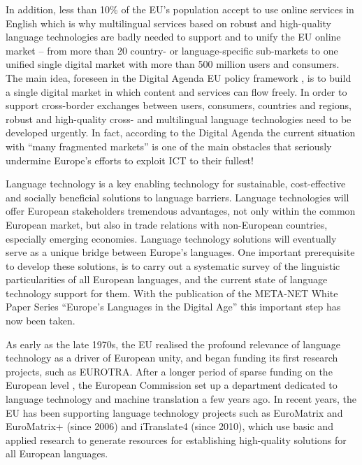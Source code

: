 \documentclass[10pt, plain]{../../metanetpaper}
\begin{document}
\begin{multicols}{2}
In addition, less than 10\% of the EU's population accept to use online services in English which is why multilingual services based on robust and high-quality language technologies are badly needed to support and to unify the EU online market -- from more than 20 country- or language-specific sub-markets to one unified single digital market with more than 500 million users and consumers. The main idea, foreseen in the Digital Agenda EU policy framework \cite{DA2010}, is to build a single digital market in which content and services can flow freely. In order to support cross-border exchanges between users, consumers, countries and regions, robust and high-quality cross- and multilingual language technologies need to be developed urgently. In fact, according to the Digital Agenda \cite{DA2010} the current situation with ``many fragmented markets'' is one of the main obstacles that seriously undermine Europe's efforts to exploit ICT to their fullest!

Language technology is a key enabling technology for sustainable, cost-effective and socially beneficial solutions to language barriers. Language technologies will offer European stakeholders tremendous advantages, not only within the common European market, but also in trade relations with non-European countries, especially emerging economies. Language technology solutions will eventually serve as a unique bridge between Europe's languages. One important prerequisite to develop these solutions, is to carry out a systematic survey of the linguistic particularities of all European languages, and the current state of language technology support for them. With the publication of the META-NET White Paper Series ``Europe's Languages in the Digital Age'' \cite{LWP2012} this important step has now been taken.

As early as the late 1970s, the EU realised the profound relevance of language technology as a driver of European unity, and began funding its first research projects, such as EUROTRA. After a longer period of sparse funding on the European level \cite{laz1,euromap}, the European Commission set up a department dedicated to language technology and machine translation a few years ago. In recent years, the EU has been supporting language technology projects such as EuroMatrix and EuroMatrix+ (since 2006) and iTranslate4 (since 2010), which use basic and applied research to generate resources for establishing high-quality solutions for all European languages.


\end{multicols}
\end{document}
